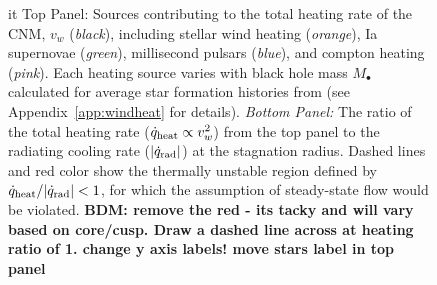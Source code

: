\documentclass[usenatbib,fleqn]{mn2e}
\newcommand{\Mbh}[1][]{M_{\bullet#1}}
\newcommand{\vwO}{v_{w}}
\begin{document}
\begin{figure}
\caption{\label{fig:vwSources} {it Top Panel:} Sources contributing to the total heating rate of the CNM, $\vwO$ ({\it black}), including stellar wind heating ({\it orange}), Ia supernovae ({\it green}), millisecond pulsars ({\it blue}), and compton heating ({\it pink}).  Each heating source varies with black hole mass $\Mbh$ calculated for average star formation histories from
  \citet{MosterNaab+:2013a} (see Appendix~\ref{app:windheat} for details).  {\it Bottom Panel:} The
  ratio of the total heating rate ($\dot{q}_{\rm heat} \propto v_{w}^{2}$) from the top panel to the radiating cooling rate
  ($|\dot{q}_{\rm rad}|$) at the stagnation radius.  Dashed lines and red color show the thermally unstable region defined by $\dot{q}_{\rm heat}/|\dot{q}_{\rm rad}| < 1$, for which the assumption of steady-state flow would be violated.  {\bf BDM: remove the red - its tacky and will vary based on core/cusp.  Draw a dashed line across at heating ratio of 1.  change y axis labels!  move stars label in top panel}}
\end{figure}
\end{document}

